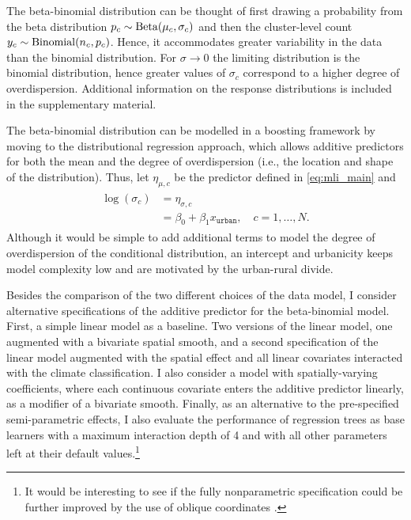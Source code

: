 The beta-binomial distribution can be thought of first drawing a probability from the beta distribution $p_c \sim \operatorname{Beta}(\mu_c, \sigma_c)$ and then the cluster-level count $y_c \sim \operatorname{Binomial}(n_c, p_c)$. Hence, it accommodates greater variability in the data than the binomial distribution. For $\sigma \rightarrow 0$ the limiting distribution is the binomial distribution, hence greater values of $\sigma_c$ correspond to a higher degree of overdispersion. Additional information on the response distributions is included in the supplementary material.

The beta-binomial distribution can be modelled in a boosting framework by moving to the distributional regression approach, which allows additive predictors for both the mean and the degree of overdispersion (i.e., the location and shape of the distribution). Thus, let $\eta_{\mu, c}$ be the predictor defined in \autoref{eq:mli_main} and 
\begin{align}
	\begin{split}
		\log(\sigma_c) & = \eta_{\sigma, c}\\
		& = \beta_0 + \beta_1 x_{\mathtt{urban}}, \quad c = 1, \dots, N.
	\end{split}
\end{align}
Although it would be simple to add additional terms to model the degree of overdispersion of the conditional distribution, an intercept and urbanicity keeps model complexity low and are motivated by the urban-rural divide. 

Besides the comparison of the two different choices of the data model, I consider alternative specifications of the additive predictor for the beta-binomial model. First, a simple linear model as a baseline. Two versions of the linear model, one augmented with a bivariate spatial smooth, and a second specification of the linear model augmented with the spatial effect and all linear covariates interacted with the climate classification. I also consider a model with spatially-varying coefficients, where each continuous covariate enters the additive predictor linearly, as a modifier of a bivariate smooth. Finally, as an alternative to the pre-specified semi-parametric effects, I also evaluate the performance of regression trees as base learners with a maximum interaction depth of 4 and with all other parameters left at their default values.\footnote{It would be interesting to see if the fully nonparametric specification could be further improved by the use of oblique coordinates \autocite{mollerObliqueGeographicCoordinates2020}.}

